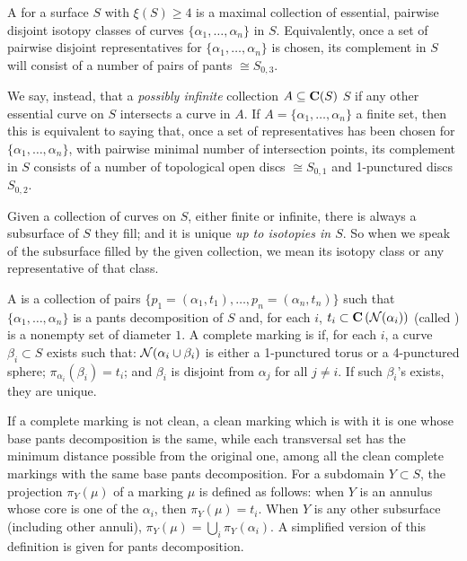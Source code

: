 A  for a surface $S$ with $\xi(S)\geq 4$ is a maximal collection of essential, pairwise disjoint isotopy classes of curves $\{\alpha_1,\ldots,\alpha_n\}$ in $S$. Equivalently, once a set of pairwise disjoint representatives for $\{\alpha_1,\ldots,\alpha_n\}$ is chosen, its complement in $S$ will consist of a number of pairs of pants $\cong S_{0,3}$.

We say, instead, that a \emph{possibly infinite} collection $A\subseteq \mathbf C(S)$  $S$ if any other essential curve on $S$ intersects a curve in $A$. If $A=\{\alpha_1,\ldots,\alpha_n\}$ a finite set, then this is equivalent to saying that, once a set of representatives has been chosen for $\{\alpha_1,\ldots,\alpha_n\}$, with pairwise minimal number of intersection points, its complement in $S$ consists of a number of topological open discs $\cong S_{0,1}$ and 1-punctured discs $S_{0,2}$.

Given a collection of curves on $S$, either finite or infinite, there is always a subsurface of $S$ they fill; and it is unique \emph{up to isotopies in $S$}. So when we speak of the subsurface filled by the given collection, we mean its isotopy class or any representative of that class.

A  is a collection of pairs $\{p_1=(\alpha_1,t_1),\ldots,p_n=(\alpha_n,t_n)\}$ such that $\{\alpha_1,\ldots,\alpha_n\}$ is a pants decomposition of $S$ and, for each $i$, $t_i\subset \mathbf C\left({\mathcal N}(\alpha_i)\right)$ (called ) is a nonempty set of diameter $1$. A complete marking is  if, for each $i$, a curve $\beta_i\subset S$ exists such that: ${\mathcal N}(\alpha_i\cup\beta_i)$ is either a 1-punctured torus or a 4-punctured sphere; $\pi_{\alpha_i}(\beta_i)=t_i$; and $\beta_i$ is disjoint from $\alpha_j$ for all $j\not=i$. If such $\beta_i$'s exists, they are unique.

If a complete marking is not clean, a clean marking which is  with it is one whose base pants decomposition is the same, while each transversal set has the minimum distance possible from the original one, among all the clean complete markings with the same base pants decomposition. For a subdomain $Y\subset S$, the projection $\pi_Y(\mu)$ of a marking $\mu$ is defined as follows: when $Y$ is an annulus whose core is one of the $\alpha_i$, then $\pi_Y(\mu)=t_i$. When $Y$ is any other subsurface (including other annuli), $\pi_Y(\mu)=\bigcup_i \pi_Y(\alpha_i)$. A simplified version of this definition is given for pants decomposition.

